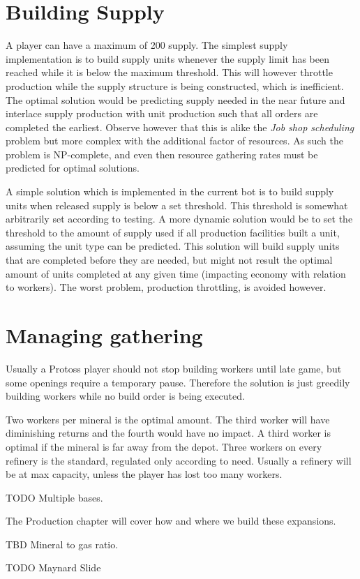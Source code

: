 \section{Building Supply}
A player can have a maximum of 200 supply. The simplest supply implementation is to build supply units whenever the supply limit has been reached while it is below the maximum threshold. This will however throttle production while the supply structure is being constructed, which is inefficient. The optimal solution would be predicting supply needed in the near future and interlace supply production with unit production such that all orders are completed the earliest. Observe however that this is alike the \emph{Job shop scheduling} problem but more complex with the additional factor of resources. As such the problem is NP-complete, and even then resource gathering rates must be predicted for optimal solutions.

A simple solution which is implemented in the current bot is to build supply units when released supply is below a set threshold. This threshold is somewhat arbitrarily set according to testing. A more dynamic solution would be to set the threshold to the amount of supply used if all production facilities built a unit, assuming the unit type can be predicted. This solution will build supply units that are completed before they are needed, but might not result the optimal amount of units completed at any given time (impacting economy with relation to workers). The worst problem, production throttling, is avoided however.

\section{Managing gathering}
Usually a Protoss player should not stop building workers until late game, but some openings require a temporary pause. Therefore the solution is just greedily building workers while no build order is being executed.

Two workers per mineral is the optimal amount. The third worker will have diminishing returns and the fourth would have no impact. A third worker is optimal if the mineral is far away from the depot. Three workers on every refinery is the standard, regulated only according to need. Usually a refinery will be at max capacity, unless the player has lost too many workers.

TODO Multiple bases.

The Production chapter will cover how and where we build these expansions.

TBD Mineral to gas ratio.

TODO Maynard Slide